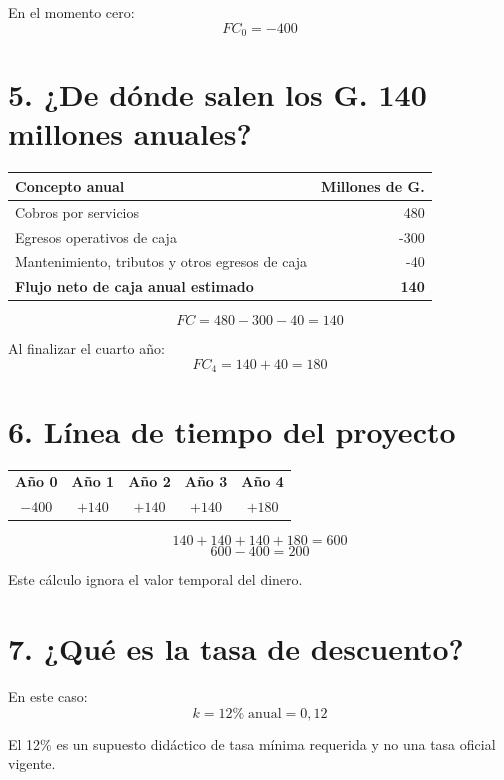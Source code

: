 \documentclass[11pt,a4paper]{article}
\begin{document}
En el momento cero:
\[
FC_0=-400
\]

\section*{5. ¿De dónde salen los G. 140 millones anuales?}

\begin{center}
\begin{tabularx}{0.88\textwidth}{Xr}
\toprule
\textbf{Concepto anual} & \textbf{Millones de G.}\\
\midrule
Cobros por servicios & 480\\
Egresos operativos de caja & -300\\
Mantenimiento, tributos y otros egresos de caja & -40\\
\midrule
\textbf{Flujo neto de caja anual estimado} & \textbf{140}\\
\bottomrule
\end{tabularx}
\end{center}

\[
FC = 480 - 300 - 40 = 140
\]

Al finalizar el cuarto año:
\[
FC_4=140+40=180
\]

\section*{6. Línea de tiempo del proyecto}

\begin{center}
\begin{tabular}{ccccc}
\textbf{Año 0} & \textbf{Año 1} & \textbf{Año 2} & \textbf{Año 3} & \textbf{Año 4}\\[5pt]
$-400$ & $+140$ & $+140$ & $+140$ & $+180$\\
\end{tabular}
\end{center}

\[
140+140+140+180=600
\]
\[
600-400=200
\]

Este cálculo ignora el valor temporal del dinero.

\section*{7. ¿Qué es la tasa de descuento?}

En este caso:
\[
k=12\%\;\text{anual}=0{,}12
\]

El 12\% es un supuesto didáctico de tasa mínima requerida y no una tasa oficial vigente.
\end{document}
